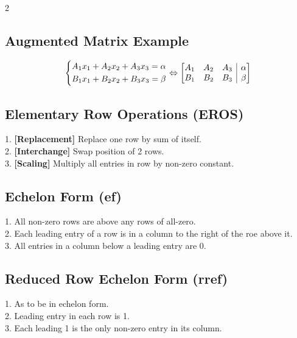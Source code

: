 \documentclass[5pt]{article}
\makeatletter
\newenvironment{amatrix}[1]{%
  \left[\begin{array}{@{}*{#1}{c}|c@{}}
}{%
  \end{array}\right]
}
\makeatother
\begin{document}
\begin{multicols}{2}
\subsection{Augmented Matrix Example}
\begin{equation}
\left\{\begin{split}
A_1x_1+A_2x_2+A_3x_3=\alpha \\
B_1x_1+B_2x_2+B_3x_3=\beta \\
\end{split}\right.
\Leftrightarrow
\begin{amatrix}{3}
    A_1 & A_2 & A_3 & \alpha \\
    B_1 & B_2 & B_3 & \beta \\
 \end{amatrix}
\end{equation}

\subsection{Elementary Row Operations (EROS)}
1. \textbf{[Replacement]} Replace one row by sum of itself. \\
2. \textbf{[Interchange]} Swap position of 2 rows. \\
3. \textbf{[Scaling]} Multiply all entries in row by non-zero constant. \\


\subsection{Echelon Form (ef)}
1. All non-zero rows are above any rows of all-zero. \\
2. Each leading entry of a row is in a column to the right of the roe above it. \\
3. All entries in a column below a leading entry are 0. \\


\subsection{Reduced Row Echelon Form (rref)}
1. As to be in echelon form. \\
2. Leading entry in each row is 1. \\
3. Each leading 1 is the only non-zero entry in its column. \\


\end{multicols}
\end{document}
